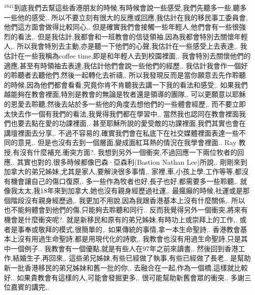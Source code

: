 \documentclass{book}
\begin{document}
$^{1841}$到底我們去幫這些香港朋友的時候,有時候會說一些感受,我們先聽多一些,聽多一些他的感受,.
所以不要立刻有很大的反應或回應,我估計在我的移民事工委員會,他們這方面會做得比較同心,.
但是確實我們會接觸一些年輕人,他們會有一些很強烈的看法,.
但是我估計,我都會和一班教會的信徒領袖,因為我都會特別去關懷年輕人,.
所以我會特別去主動,亦是聽一下他們的心聲,我估計在一些感受上去表達,.
我估計在一些我稱為coffee time,即是和年輕人去到校園裡面,.
我會特別去關懷他們的適應,甚至有時領袖去表達,我估計他們會說一些他們的經歷,.
我估計我會作一個好的聆聽者去聽他們,然後一起轉化去祈禱,.
所以我發現反而是當你願意去先作聆聽的時候,因為他們都會看看,究竟你肯不肯聽我去講一下我的看法和感受,.
如果我們越能夠在教會裡面,特別是教會的無論是牧者還是領導的團隊,.
可以更願意以耶穌的恩愛去聆聽,然後去站於多一些他的角度去想他們的一些體會經歷,.
而不要立即太快去作一個有我們的看法,我覺得我們都在學習中,.
當然我也認同在教會裡面我們也要去點在愛的功課裡面,.
甚至耶穌所說的愛受敵的功課裡面,我們其實也會在講壇裡面去分享,.
不過不容易的,確實我們會在私底下在社交媒體裡面表達一些不同的意見,.
但是也沒有去到一個層面,變成面紅耳熱的情況在我學會裡面..
Ray 教授,有沒有什麼補充,衝突方面?.
我想到另外一個衝突,不過回應一下兩位牧者的回應,.
其實也對的,很多時候都像巴森·亞森利(Bastion Nathan Lee)所說,.
剛剛來到加拿大的弟兄姊妹,尤其是家人,要解決很多事情,.
家裡,車,小孩上學,工作等等,都沒有機會讓自己的傷口復原,.
多一些作為牧者也好,長子也好,都需要多一些聆聽,.
就像我太太,我18年來到加拿大,她也沒有親身經歷過社運,.
最瘋癲的時候,社運或是那個階段沒有親身經歷過,.
我更加不用說,因為我跟香港基本上沒有什麼關係,.
所以也不能夠體會到他們的傷,只能夠去聆聽和同行..
反而我覺得另外一個衝突,將來有機會是什麼衝突呢?.
就是新移民和原有的弟兄姊妹,有時功上或崇拜上的工作,.
或者是事奉或敬拜的模式,很簡單的,.
如果傳統的事情,拿一本生命聖詩,.
香港教會基本上沒有用過生命聖詩,都是用現代化的詩歌,.
我教會也沒有用過生命聖詩,只是其中一個例子..
我教會有一個優點,就是有些人在97年之前來讀書,.
然後回到香港工作,結婚生子,再回來,.
這些弟兄姊妹,有些已經做了執事,有些已經做了長老,.
是幫助新一批香港移民的弟兄姊妹和舊一批的你,.
去融合在一起,作為一個橋,這樣就比較好..
如果貴教會有這樣的人,可能會發掘更多,.
很可能幫助新舊會眾的衝突..
多謝三位嘉賓的講完,.
\end{document}
